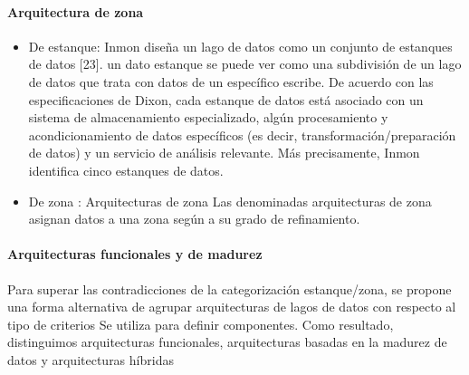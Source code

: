 \documentclass[twoside,twocolumn]{article}
\begin{document}
\paragraph{Arquitectura de zona}
\begin{itemize}
    \item De estanque: Inmon diseña un lago de datos como un conjunto de estanques de datos [23]. un dato estanque se puede ver como una subdivisión de un lago de datos que trata con datos de un específico escribe. De acuerdo con las especificaciones de Dixon, cada estanque de datos está asociado con un sistema de almacenamiento especializado, algún procesamiento y acondicionamiento de datos específicos (es decir, transformación/preparación de datos) y un servicio de análisis relevante. Más precisamente, Inmon identifica cinco estanques de datos.
    \item  De zona : Arquitecturas de zona Las denominadas arquitecturas de zona asignan datos a una zona según a su grado de refinamiento.
\end{itemize}
\paragraph{Arquitecturas funcionales y de madurez}
Para superar las contradicciones de la categorización estanque/zona, se propone una forma alternativa de agrupar arquitecturas de lagos de datos con respecto al tipo de criterios Se utiliza para definir componentes. Como resultado, distinguimos arquitecturas funcionales, arquitecturas basadas en la madurez de datos y arquitecturas híbridas
\end{document}

